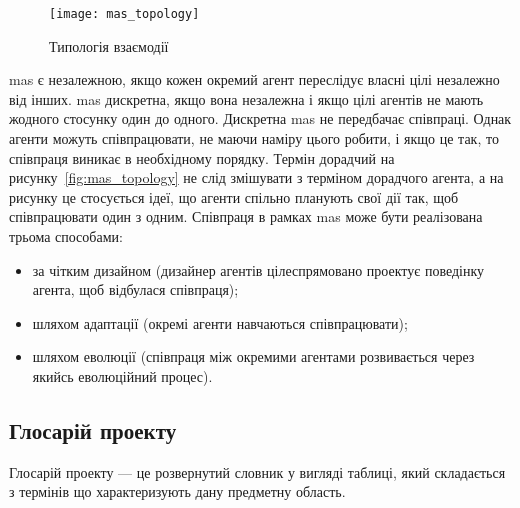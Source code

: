 \begin{figure}[H]
	\centering
	\texttt{[image: mas\_topology]}
	\caption{Типологія взаємодії}
	\label{fig:agent_general}
\end{figure}

\acrshort{mas} є незалежною, якщо кожен окремий агент переслідує власні цілі незалежно від інших. \acrshort{mas} дискретна, якщо вона незалежна і якщо цілі агентів не мають жодного стосунку один до одного. Дискретна \acrshort{mas} не передбачає співпраці. Однак агенти можуть співпрацювати, не маючи наміру цього робити, і якщо це так, то співпраця виникає в необхідному порядку. Термін дорадчий на рисунку~\ref{fig:mas_topology} не слід змішувати з терміном дорадчого агента, а на рисунку це стосується ідеї, що агенти спільно планують свої дії так, щоб співпрацювати один з одним. Співпраця в рамках \acrshort{mas} може бути реалізована трьома способами:

\begin{itemize}
	\item за чітким дизайном (дизайнер агентів цілеспрямовано проектує поведінку агента, щоб відбулася співпраця);
	\item шляхом адаптації (окремі агенти навчаються співпрацювати);
	\item шляхом еволюції (співпраця між окремими агентами розвивається через якийсь еволюційний процес).
\end{itemize}

\subsection{Глосарій проекту}
Глосарій проекту --- це розвернутий словник у вигляді таблиці, який складається з термінів що характеризують дану предметну область.

